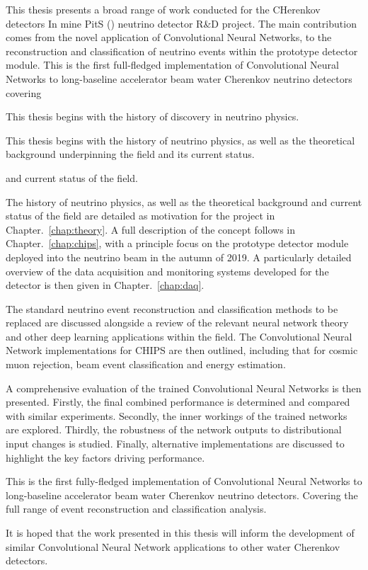 This thesis presents a broad range of work conducted for the CHerenkov detectors In mine PitS
(\chips) neutrino detector R\&D project. The main contribution comes from the novel application of
Convolutional Neural Networks, to the reconstruction and classification of neutrino events within
the \chipsfive prototype detector module. This is the first full-fledged implementation of
Convolutional Neural Networks to long-baseline accelerator beam water Cherenkov neutrino detectors
covering 

This thesis begins with the history of discovery in neutrino physics.

This thesis begins with the history of neutrino physics, as well as the theoretical background
underpinning the field and its current status. 


and
current status of the field.


The history of neutrino physics, as well as the theoretical background and current status of the
field are detailed as motivation for the \chips project in Chapter.~\ref{chap:theory}. A
full description of the \chips concept follows in Chapter.~\ref{chap:chips}, with a principle
focus on the \chipsfive prototype detector module deployed into the \numi neutrino beam in the
autumn of 2019. A particularly detailed overview of the data acquisition and monitoring systems
developed for the \chipsfive detector is then given in Chapter.~\ref{chap:daq}.

The standard neutrino event reconstruction and classification methods to be replaced are discussed
alongside a review of the relevant neural network theory and other deep learning applications
within the field. The Convolutional Neural Network implementations for CHIPS are then outlined,
including that for cosmic muon rejection, beam event classification and energy estimation.

A comprehensive evaluation of the trained Convolutional Neural Networks is then presented.
Firstly, the final combined performance is determined and compared with similar experiments.
Secondly, the inner workings of the trained networks are explored. Thirdly, the robustness of the
network outputs to distributional input changes is studied. Finally, alternative implementations
are discussed to highlight the key factors driving performance.

This is the first fully-fledged implementation of Convolutional Neural Networks to long-baseline
accelerator beam water Cherenkov neutrino detectors. Covering the full range of event
reconstruction and classification analysis. 

It is hoped that the work presented in this thesis will inform the development of similar
Convolutional Neural Network applications to other water Cherenkov detectors.

